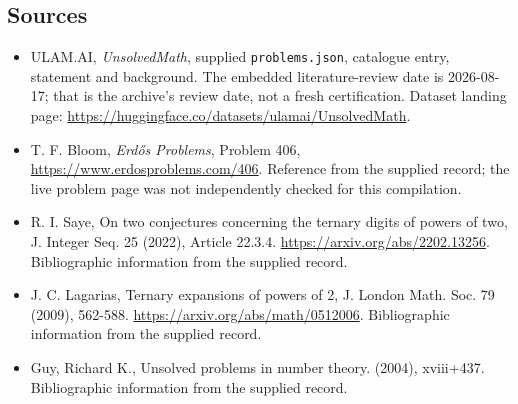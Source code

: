\documentclass[11pt,a4paper]{article}
\begin{document}
\subsection{Sources}

{\small

\begin{itemize}

\item[\hypertarget{source:statement:1}{S1}] ULAM.AI, \emph{UnsolvedMath}, supplied \texttt{problems.json}, catalogue entry, statement and background. The embedded literature-review date is 2026-08-17; that is the archive’s review date, not a fresh certification. Dataset landing page: \url{https://huggingface.co/datasets/ulamai/UnsolvedMath}.

\item[\hypertarget{source:statement:2}{S2}] T. F. Bloom, \emph{Erdős Problems}, Problem 406, \url{https://www.erdosproblems.com/406}. Reference from the supplied record; the live problem page was not independently checked for this compilation.

\item[\hypertarget{source:statement:3}{S3}] R. I. Saye, On two conjectures concerning the ternary digits of powers of two, J. Integer Seq. 25 (2022), Article 22.3.4. \url{https://arxiv.org/abs/2202.13256}. Bibliographic information from the supplied record.

\item[\hypertarget{source:statement:4}{S4}] J. C. Lagarias, Ternary expansions of powers of 2, J. London Math. Soc. 79 (2009), 562-588. \url{https://arxiv.org/abs/math/0512006}. Bibliographic information from the supplied record.

\item[\hypertarget{source:statement:5}{S5}] Guy, Richard K., Unsolved problems in number theory. (2004), xviii+437. Bibliographic information from the supplied record.

\end{itemize}

}

\label{end:statement}
\end{document}
